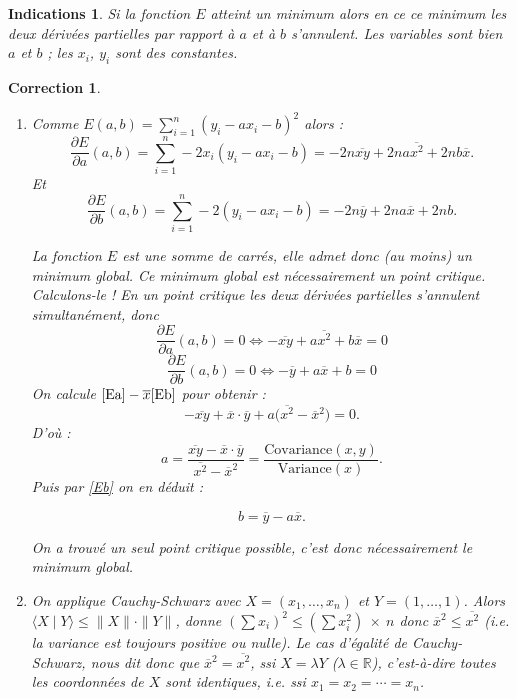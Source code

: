 \documentclass[11pt,a4paper]{article}
\newcommand{\Rr}{\mathbb{R}} \newcommand{\R}{\mathbb{R}}
\renewcommand{\le}{\leqslant} \renewcommand{\leq}{\leqslant}
\theoremstyle{exostyle}
\newtheorem{ind}{Indications}
\newtheorem{cor}{Correction}
\newcommand{\indication}{\begin{ind}} \newcommand{\finindication}{\end{ind}}
\newcommand{\correction}{\begin{cor}} \newcommand{\fincorrection}{\end{cor}}
\begin{document}
\indication
Si la fonction $E$ atteint un minimum alors en ce ce minimum les deux dérivées partielles par rapport à $a$ et à $b$ s'annulent. Les variables sont bien $a$ et $b$ ; les $x_i$, $y_i$ sont des constantes.
\finindication

\correction
\begin{enumerate}
	\item 
	Comme $E(a,b) = \sum_{i=1}^n (y_i-ax_i-b)^2$ alors :
	\[
	\frac{\partial E}{\partial a}(a,b) 
	= \sum_{i=1}^n -2x_i(y_i-ax_i-b)
	= -2n \overline {xy} + 2n a \overline{x^2} + 2nb \overline{x}.\]
	Et 
	\[
	\frac{\partial E}{\partial b}(a,b) 
	= \sum_{i=1}^n -2(y_i-ax_i-b)
	= -2n \overline{y} + 2n a \overline{x} +2nb.\]
		
	La fonction $E$ est une somme de carrés, elle admet donc (au moins) un minimum global.
	Ce minimum global est nécessairement un point critique. Calculons-le !
	En un point critique les deux dérivées partielles s'annulent simultanément, donc
	\begin{equation}
		\label{Ea}
		\tag{$E_a$}
	\frac{\partial E}{\partial a}(a,b)	= 0 \iff - \overline {xy} +  a \overline{x^2} + b \overline{x} = 0
	\end{equation}
	\begin{equation}
	\label{Eb}
	\tag{$E_b$}
	\frac{\partial E}{\partial b}(a,b)	= 0 \iff  - \overline{y} +  a \overline{x} + b= 0
	\end{equation}	
	On calcule $\eqref{Ea} - \overline{x} \eqref{Eb}$ pour obtenir :
	\[
	- \overline {xy}+ \overline{x} \cdot \overline{y} + a\big( \overline{x^2} -\overline{x}^2 \big) = 0.
	\]
	D'où :
	\[
	a = \frac{\overline {xy} - \overline  x \cdot \overline  y}{  \overline{x^2} - \overline{x}^2} = \frac{\text{Covariance}(x,y)}{\text{Variance}(x)}.
	\]
	Puis par \eqref{Eb} on en déduit :

	\[b= \overline  y - a \overline  x.\]
	
	On a trouvé un seul point critique possible, c'est donc nécessairement le minimum global.
	
	\item  On applique Cauchy-Schwarz avec $X = (x_1,\ldots,x_n)$ et $Y= (1,\ldots,1)$.
	Alors $\langle X \mid Y \rangle \le \| X \| \cdot \| Y \|$, donne
	$\left( \sum x_i \right)^2 \le \left(\sum x_i^2\right) \ \times \ n$
	donc $\overline{x}^2 \le \overline{x^2}$ (i.e. la variance est toujours positive ou nulle).
	Le cas d'égalité de Cauchy-Schwarz, nous dit donc que $\overline{x}^2 = \overline{x^2}$, ssi $X = \lambda Y$ ($\lambda\in\Rr$), c'est-à-dire toutes les coordonnées de $X$ sont identiques, i.e. ssi $x_1=x_2=\cdots=x_n$.
	
\end{enumerate}
\fincorrection
\finexercice
\end{document}
